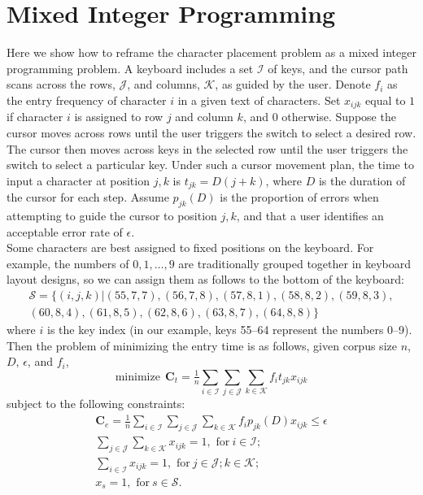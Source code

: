 \documentclass{sig-alternate}
\begin{document}
\section{Mixed Integer Programming}
Here we show how to reframe the character placement problem as a mixed integer programming problem. A keyboard includes a set $\mathcal{I}$ of keys, and the cursor path scans across the rows, $\mathcal{J}$, and columns, $\mathcal{K}$, as guided by the user. Denote $f_{i}$ as the entry frequency of character $i$ in a given text of characters.  Set $x_{ijk}$ equal to $1$ if character $i$ is assigned to row $j$ and column $k$, and $0$ otherwise. Suppose the cursor moves across rows until the user triggers the switch to select a desired row. The cursor then moves across keys in the selected row until the user triggers the switch to select a particular key. Under such a cursor movement plan, the time to input a  character  at position $j,k$ is $t_{jk}=D(j+k)$, where $D$ is the duration of the cursor for each step. Assume $p_{jk}(D)$ is the proportion of errors when attempting to guide the cursor to position $j,k$, and that a user identifies an acceptable error rate of $\epsilon$.\\
Some characters are best assigned to fixed positions on the keyboard. For example,  the numbers of $0,1,\dots,9$ are traditionally grouped together in keyboard layout designs, so we can assign them as follows to the bottom of the keyboard: 
\begin{eqnarray*}
\mathcal{S} =\{(i,j,k)\vert (55, 7, 7),
(56, 7, 8), (57, 8, 1), (58, 8, 2), (59, 8, 3),\\
(60, 8, 4), (61, 8, 5), (62, 8, 6), (63, 8, 7), (64, 8,8)\}
\end{eqnarray*} 
where $i$ is the key index (in our example, keys 55--64 represent the numbers 0--9).  Then 
the problem of minimizing the entry time is as follows, given corpus size $n$, $D$, $\epsilon$, and $f_{i}$, 
\begin{equation}
\text{minimize}\ \ \mathbf{C}_{t}=\tfrac{1}{n}\sum\limits_{i\in \mathcal{I}}\sum\limits_{j\in \mathcal{J}}\sum\limits_{k\in \mathcal{K}}f_{i} t_{jk} x_{ijk} \label{d3} \tag{1a}
\end{equation}
subject to the following constraints:
\begin{align}
\mathbf{C}_{e}= \tfrac{1}{n}\sum\limits_{i\in \mathcal{I}}\sum\limits_{j\in \mathcal{J}}\sum\limits_{k\in
\mathcal{K}}f_i p_{jk}(D)x_{ijk} \le \epsilon \label{d4} \tag{1b}\\
\sum\limits_{j\in \mathcal{J}}\sum\limits_{k\in \mathcal{K}}x_{ijk}=1, \mbox{ for}\ i\in\mathcal{I};\label{d5}\tag{1c}\\
\sum\limits_{i\in \mathcal{I}}x_{ijk}=1, \mbox{ for}\ j\in\mathcal{J}; k\in\mathcal{K};\label{d6}\tag{1d}\\
x_s=1, \mbox{ for}\ s\in\mathcal{S}. \label{d7}\tag{1e}
\end{align}
\end{document}
